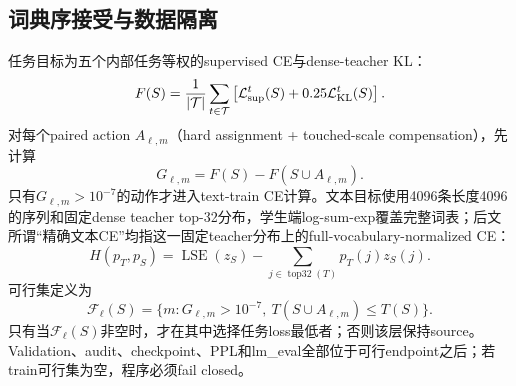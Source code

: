 \subsection{词典序接受与数据隔离}

任务目标为五个内部任务等权的supervised CE与dense-teacher KL：
\begin{equation}
F(S)=\frac1{|\mathcal T|}\sum_{t\in\mathcal T}
\left[\mathcal L_{\rm sup}^t(S)+0.25\mathcal L_{\rm KL}^t(S)\right].
\end{equation}
对每个paired action $A_{\ell,m}$（hard assignment + touched-scale compensation），先计算
\begin{equation}
G_{\ell,m}=F(S)-F(S\cup A_{\ell,m}).
\end{equation}
只有$G_{\ell,m}>10^{-7}$的动作才进入text-train CE计算。文本目标使用4096条长度4096的序列和固定dense teacher top-32分布，学生端log-sum-exp覆盖完整词表；后文所谓``精确文本CE''均指这一固定teacher分布上的full-vocabulary-normalized CE：
\begin{equation}
H(p_T,p_S)=\operatorname{LSE}(z_S)-\sum_{j\in\operatorname{top32}(T)}p_T(j)z_S(j).
\end{equation}
可行集定义为
\begin{equation}
\mathcal F_\ell(S)=\{m:G_{\ell,m}>10^{-7},\ T(S\cup A_{\ell,m})\le T(S)\}.
\end{equation}
只有当$\mathcal F_\ell(S)$非空时，才在其中选择任务loss最低者；否则该层保持source。Validation、audit、checkpoint、PPL和lm\_eval全部位于可行endpoint之后；若train可行集为空，程序必须fail closed。
